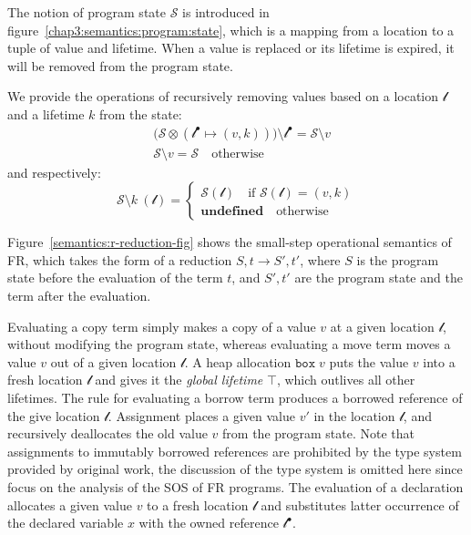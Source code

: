 The notion of program state $\mathcal{S}$ is introduced in figure~\ref{chap3:semantics:program:state}, which is a mapping from a location to a tuple of value and lifetime. When a value is replaced or its lifetime is expired, it will be removed from the program state.

We provide the operations of recursively removing values based on a location $\mathscr{l}$ and a lifetime $k$ from the state: 
\begin{align*}
      &\bigl(\mathcal{S}\otimes(\mathscr{l}^\bullet \mapsto (v, k))\bigr)\setminus {\mathscr{l}^\bullet} = \mathcal{S}\setminus v \\
      &\mathcal{S}\setminus v = \mathcal{S} \quad\text{otherwise}
\end{align*}
and respectively:
\[
   \mathcal{S}\setminus k \ (\mathscr{l}) =
    \begin{cases}
      \mathcal{S}(\mathscr{l}) \quad\text{if $\mathcal{S}(\mathscr{l})=(v,k)$} \\
      \textbf{undefined}\quad\text{otherwise}
    \end{cases}
\] %

Figure~\ref{semantics:r-reduction-fig} shows the small-step operational semantics of FR, which takes the form of a reduction $S, t \longrightarrow S', t'$, where $S$ is the program state before the evaluation of the term $t$, and $S', t'$ are the program state and the term after the evaluation.

Evaluating a copy term simply makes a copy of a value $v$ at a given location $\mathscr{l}$, without modifying the program state, whereas evaluating a move term moves a value $v$ out of a given location $\mathscr{l}$.
A heap allocation $\texttt{box}\;v$ puts the value $v$ into a fresh location $\mathscr{l}$ and gives it the \emph{global lifetime} $\top$, which outlives all other lifetimes. The rule for evaluating a borrow term produces a borrowed reference of the give location $\mathscr{l}$.
Assignment places a given value $v'$ in the location $\mathscr{l}$, and recursively deallocates the old value $v$ from the program state. Note that assignments to immutably borrowed references are prohibited by the type system provided by  original work, the discussion of the type system is omitted here since focus on the analysis of the SOS of FR programs.
The evaluation of a declaration allocates a given value $v$ to a fresh location $\mathscr{l}$ and substitutes latter occurrence of the declared variable $x$ with the owned reference $\mathscr{l}^\bullet$.

